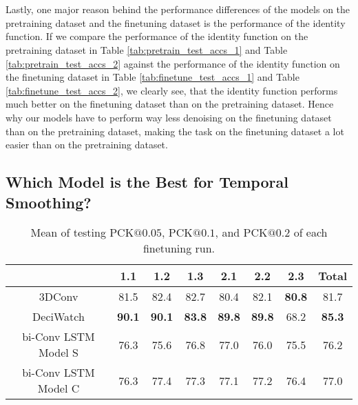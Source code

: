 \documentclass[./main.tex]{subfiles}
\begin{document}
\\
\\
Lastly, one major reason behind the performance differences of the models on the pretraining dataset and the finetuning dataset is the performance of the identity function. If we compare the performance of the identity function on the pretraining dataset in Table \ref{tab:pretrain_test_accs_1} and Table \ref{tab:pretrain_test_accs_2} against the performance of the identity function on the finetuning dataset in Table \ref{tab:finetune_test_accs_1} and Table \ref{tab:finetune_test_accs_2}, we clearly see, that the identity function performs much better on the finetuning dataset than on the pretraining dataset. Hence why our models have to perform way less denoising on the finetuning dataset than on the pretraining dataset, making the task on the finetuning dataset a lot easier than on the pretraining dataset.

\subsection{Which Model is the Best for Temporal Smoothing?}
\label{sec:best_model}
\begin{table}[htbp]
    \centering
    \begin{tabular}{c||cccccc|c}
        \hline
        & 1.1 & 1.2 & 1.3 & 2.1 & 2.2 & 2.3 & Total \\
        \hline
        \hline
        3DConv & 81.5 & 82.4 & 82.7 & 80.4 & 82.1 & \textbf{80.8} & 81.7 \\
        DeciWatch & \textbf{90.1} & \textbf{90.1} & \textbf{83.8} & \textbf{89.8} & \textbf{89.8} & 68.2 & \textbf{85.3} \\
        bi-Conv LSTM Model S & 76.3 & 75.6 & 76.8 & 77.0 & 76.0 & 75.5 & 76.2 \\
        bi-Conv LSTM Model C & 76.3 & 77.4 & 77.3 & 77.1 & 77.2 & 76.4 & 77.0 \\
        \hline
    \end{tabular}
    \caption{Mean of testing PCK$@0.05$, PCK$@0.1$, and PCK$@0.2$ of each finetuning run.}
    \label{tab:finetune_mean_res}
\end{table}\
\end{document}

